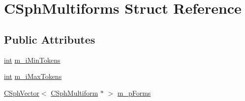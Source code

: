 \hypertarget{structCSphMultiforms}{\section{C\-Sph\-Multiforms Struct Reference}
\label{structCSphMultiforms}
}
\subsection*{Public Attributes}
\begin{DoxyCompactItemize}
\item 
\hyperlink{sphinxexpr_8cpp_a4a26e8f9cb8b736e0c4cbf4d16de985e}{int} \hyperlink{structCSphMultiforms_a6ff6b1a9bda83d2a8495568ac6c45008}{m\-\_\-i\-Min\-Tokens}
\item 
\hyperlink{sphinxexpr_8cpp_a4a26e8f9cb8b736e0c4cbf4d16de985e}{int} \hyperlink{structCSphMultiforms_aa9d8d09186e906243bf8fd2124740771}{m\-\_\-i\-Max\-Tokens}
\item 
\hyperlink{classCSphVector}{C\-Sph\-Vector}$<$ \hyperlink{structCSphMultiform}{C\-Sph\-Multiform} $\ast$ $>$ \hyperlink{structCSphMultiforms_af28f7b3e6a0d2f88f2636144d9e95554}{m\-\_\-p\-Forms}
\end{DoxyCompactItemize}


